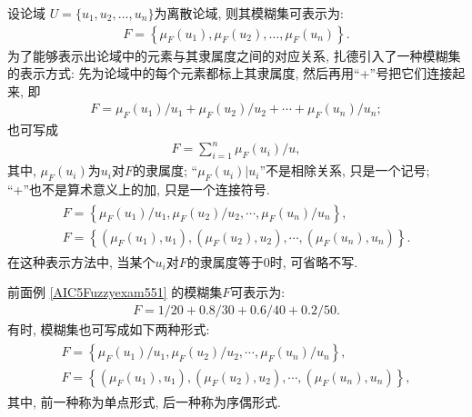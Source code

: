 设论域 $U=\{u_1, u_2, \ldots, u_n\}$为离散论域, 则其模糊集可表示为:
\begin{align}
    F=\left\{\mu_{F}\left(u_{1}\right), \mu_{F}\left(u_{2}\right), \ldots, \mu_{F}\left(u_{n}\right)\right\}.
\end{align}
为了能够表示出论域中的元素与其隶属度之间的对应关系, 扎德引入了一种模糊集的表示方式: 先为论域中的每个元素都标上其隶属度, 然后再用“+”号把它们连接起来, 即
\begin{align}
    F=\mu_{F}\left(u_{1}\right) / u_{1}+\mu_{F}\left(u_{2}\right) / u_{2}+\cdots+\mu_{F}\left(u_{n}\right) / u_{n};
\end{align}
也可写成
\begin{align}
    F=\sum_{i=1}^{n} \mu_{F}\left(u_{i}\right) / u,
\end{align}
其中, $\mu_{F}\left(u_{i}\right)$为$u_i$对$F$的隶属度; “$\mu_{F}\left(u_{i}\right) |u_{i}$”不是相除关系, 只是一个记号; “+”也不是算术意义上的加, 只是一个连接符号.
\begin{align}
    \begin{array}{ll}
        F=\left\{\mu_{F}\left(u_{1}\right) / u_{1}, \mu_{F}\left(u_{2}\right) / u_{2}, \cdots, \mu_{F}\left(u_{n}\right) / u_{n}\right\},\\
        F=\left\{\left(\mu_{F}\left(u_{1}\right), u_{1}\right),\left(\mu_{F}\left(u_{2}\right), u_{2}\right), \cdots,\left(\mu_{F}\left(u_{n}\right), u_{n}\right)\right\}.
    \end{array}
\end{align}
在这种表示方法中, 当某个$u_i$对$F$的隶属度等于$0$时, 可省略不写.
\begin{example}
    前面例 \ref{AIC5Fuzzyexam551} 的模糊集$F$可表示为:
    \begin{align}
        F=1 / 20+0.8 / 30+0.6 / 40+0.2 / 50.
    \end{align}
    有时, 模糊集也可写成如下两种形式:
    \begin{align}
        \begin{array}{l}
            F=\left\{\mu_{F}\left(u_{1}\right) / u_{1}, \mu_{F}\left(u_{2}\right) / u_{2}, \cdots, \mu_{F}\left(u_{n}\right) / u_{n}\right\},\\
            F=\left\{\left(\mu_{F}\left(u_{1}\right), u_{1}\right),\left(\mu_{F}\left(u_{2}\right), u_{2}\right), \cdots,\left(\mu_{F}\left(u_{n}\right), u_{n}\right)\right\},
        \end{array}
    \end{align}
其中, 前一种称为单点形式, 后一种称为序偶形式.
\end{example}

